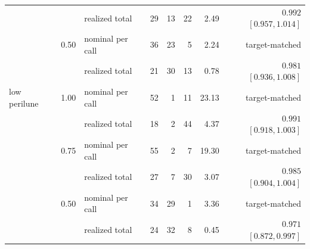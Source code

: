 \begin{tabular}{@{}l l l r r r r r@{}}
 & & realized total & 29 & 13 & 22 & 2.49 & $0.992$ $[0.957,1.014]$ \\
 & 0.50 & nominal per call & 36 & 23 & 5 & 2.24 & target-matched \\
 & & realized total & 21 & 30 & 13 & 0.78 & $0.981$ $[0.936,1.008]$ \\
\addlinespace
low perilune & 1.00 & nominal per call & 52 & 1 & 11 & 23.13 & target-matched \\
 & & realized total & 18 & 2 & 44 & 4.37 & $0.991$ $[0.918,1.003]$ \\
 & 0.75 & nominal per call & 55 & 2 & 7 & 19.30 & target-matched \\
 & & realized total & 27 & 7 & 30 & 3.07 & $0.985$ $[0.904,1.004]$ \\
 & 0.50 & nominal per call & 34 & 29 & 1 & 3.36 & target-matched \\
 & & realized total & 24 & 32 & 8 & 0.45 & $0.971$ $[0.872,0.997]$ \\
\bottomrule
\end{tabular}
